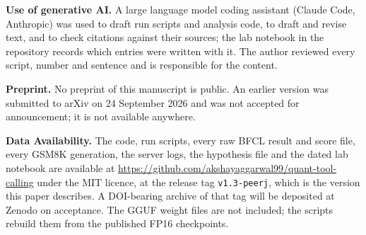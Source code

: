 \documentclass[12pt,letterpaper]{article}
\newcommand{\bfcl}{BFCL}
\begin{document}
\textbf{Use of generative AI.} A large language model coding assistant (Claude Code, Anthropic) was used to draft run scripts and analysis code, to draft and revise text, and to check citations against their sources; the lab notebook in the repository records which entries were written with it. The author reviewed every script, number and sentence and is responsible for the content.

\textbf{Preprint.} No preprint of this manuscript is public. An earlier version was submitted to arXiv on 24 September 2026 and was not accepted for announcement; it is not available anywhere.

\textbf{Data Availability.} The code, run scripts, every raw \bfcl{} result and score file, every GSM8K generation, the server logs, the hypothesis file and the dated lab notebook are available at \url{https://github.com/akshayaggarwal99/quant-tool-calling} under the MIT licence, at the release tag \texttt{v1.3-peerj}, which is the version this paper describes. A DOI-bearing archive of that tag will be deposited at Zenodo on acceptance. The GGUF weight files are not included; the scripts rebuild them from the published FP16 checkpoints.



\end{document}
